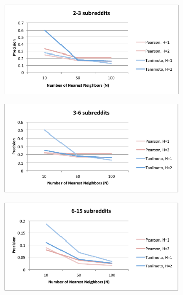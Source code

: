 \documentclass{article}
\begin{document}
\begin{figure}[H]
\centering
\begin{subfigure}[t]{.47\textwidth}
  \centering
  \includegraphics[width=0.9\linewidth]{img/2-3-p.pdf}
  \label{fig:2-3-p}
\end{subfigure}
\begin{subfigure}[t]{.47\textwidth}
  \centering
  \includegraphics[width=.9\linewidth]{img/3-6-p.pdf}
  \label{fig:3-6-p}
\end{subfigure}
\begin{subfigure}[t]{.47\textwidth}
  \centering
  \includegraphics[width=.9\linewidth]{img/6-15-p.pdf}
  \label{fig:6-15-p}
\end{subfigure}
\begin{subfigure}[t]{.47\textwidth}

\end{subfigure}
\end{figure}
\end{document}
